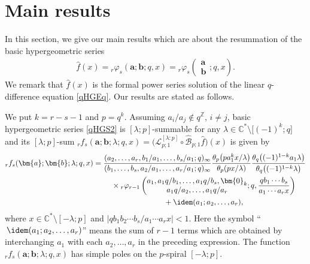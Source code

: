 \section{Main results}\label{Section:Main Results}
In this section, we give our main results which are about the resummation of the basic hypergeometric series
\begin{gather}\label{qHGS2}
\hat{f}(x)={}_r\varphi_s(\bm{a};\bm{b};q,x)={}_r\varphi_s\left( \begin{matrix}\bm{a}\\ \bm{b} \end{matrix};q,x\right).
\end{gather}
We remark that $\hat{f}(x)$ is the formal power series solution of the linear $q$-difference equation \eqref{qHGEq}. Our results are stated as follows.
\begin{Theorem}\label{Theorem:Main1}
We put $k=r-s-1$ and $p=q^k$. Assuming $a_i/a_j\notin q^{\mathbb{Z}}$, $i\neq j$, basic hypergeometric series \eqref{qHGS2} is $[\lambda;p]$-summable for any $\lambda\in\mathbb{C}^*\setminus\big[(-1)^{k};q\big]$ and its $[\lambda;p]$-sum ${}_rf_s(\bm{a};\bm{b};\lambda;q,x)=\big(\mathcal{L}_{p;1}^{[\lambda:p]}\circ\mathcal{\hat{B}}_{p;1}\hat{f}\big)(x)$ is given by
\begin{gather}
{}_rf_s(\bm{a};\bm{b};\lambda;q,x) =\frac{(a_2,\ldots,a_r,b_1/a_1,\ldots,b_{s}/a_1;q)_\infty}{(b_1,\ldots,b_{s},a_2/a_1,\ldots,a_r/a_1;q)_\infty}\frac{\theta_{p}\big(pa_1^kx/\lambda\big)}{\theta_{p}(px/\lambda)}
\frac{\theta_q\big((-1)^{1-k}a_1\lambda\big)}{\theta_q\big((-1)^{1-k}\lambda\big)}\nonumber\\
\hphantom{{}_rf_s(\bm{a};\bm{b};\lambda;q,x) =}{}
\times{}_r\varphi_{r-1}\left(\begin{matrix}a_1,a_1q/b_1,\ldots,a_1q/b_s,\bm{0}_k\\a_1q/a_2,\ldots,a_1q/a_r
\end{matrix} ;q,\frac{qb_1\cdots b_s}{a_1\cdots a_rx}\right)\nonumber\\
\hphantom{{}_rf_s(\bm{a};\bm{b};\lambda;q,x) =}{}
+\idem(a_1;a_2,\ldots,a_r),\label{Main1}
\end{gather}
where $x\in\mathbb{C}^*\setminus[-\lambda;p]$ and $|qb_1b_2\cdots b_s/a_1\cdots a_rx|<1$. Here the symbol ``$\,\idem(a_1;a_2,\ldots,a_r)$'' means the sum of $r-1$ terms which are obtained by interchanging $a_1$ with each $a_2,\ldots,a_r$ in the preceding expression.
The function ${}_rf_s(\bm{a};\bm{b};\lambda;q,x)$ has simple poles on the $p$-spiral $[-\lambda;p]$.
\end{Theorem}
